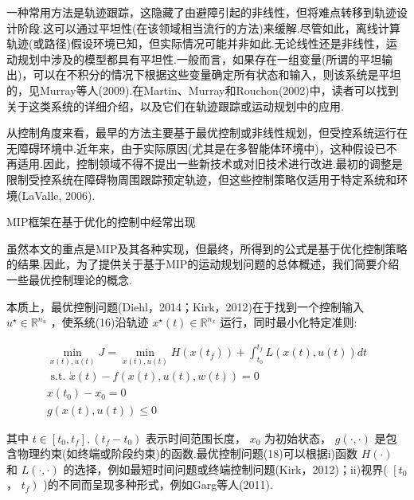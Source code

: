 \documentclass[10pt]{article}
\begin{document}
一种常用方法是轨迹跟踪，这隐藏了由避障引起的非线性，但将难点转移到轨迹设计阶段.这可以通过平坦性(在该领域相当流行的方法)来缓解.尽管如此，离线计算轨迹(或路径)假设环境已知，但实际情况可能并非如此.无论线性还是非线性，运动规划中涉及的模型都具有平坦性.一般而言，如果存在一组变量(所谓的平坦输出)，可以在不积分的情况下根据这些变量确定所有状态和输入，则该系统是平坦的，见Murray等人(2009).在Martin、Murray和Rouchon(2002)中，读者可以找到关于这类系统的详细介绍，以及它们在轨迹跟踪或运动规划中的应用.

从控制角度来看，最早的方法主要基于最优控制或非线性规划，但受控系统运行在无障碍环境中.近年来，由于实际原因(尤其是在多智能体环境中)，这种假设已不再适用.因此，控制领域不得不提出一些新技术或对旧技术进行改进.最初的调整是限制受控系统在障碍物周围跟踪预定轨迹，但这些控制策略仅适用于特定系统和环境(LaValle, 2006).

MIP框架在基于优化的控制中经常出现

虽然本文的重点是MIP及其各种实现，但最终，所得到的公式是基于优化控制策略的结果.因此，为了提供关于基于MIP的运动规划问题的总体概述，我们简要介绍一些最优控制理论的概念.

本质上，最优控制问题(Diehl，2014；Kirk，2012)在于找到一个控制输入 \({u}^{ \star  } \in  {\mathbb{R}}^{{n}_{u}}\) ，使系统(16)沿轨迹 \({x}^{ \star  }\left( t\right)  \in  {\mathbb{R}}^{{n}_{x}}\) 运行，同时最小化特定准则:

\begin{subequations}
\begin{gather}
\mathop{\min }\limits_{{x\left( t\right) ,u\left( t\right) }}J = \mathop{\min }\limits_{{x\left( t\right) ,u\left( t\right) }}H\left( {x\left( {t}_{f}\right) }\right)  + {\int }_{{t}_{0}}^{{t}_{f}}L\left( {x\left( t\right) ,u\left( t\right) }\right) {dt} \\
\text{ s.t. }\dot{x}\left( t\right)  - f\left( {x\left( t\right) ,u\left( t\right) ,w\left( t\right) }\right)  = 0 \\
x\left( {t}_{0}\right)  - {x}_{0} = 0 \\
g\left( {x\left( t\right) ,u\left( t\right) }\right)  \leq  0
\end{gather}
\end{subequations}

其中 \(t \in  \left\lbrack  {{t}_{0},{t}_{f}}\right\rbrack  ,\left( {{t}_{f} - {t}_{0}}\right)\) 表示时间范围长度， \({x}_{0}\) 为初始状态， \(g\left( {\cdot , \cdot  }\right)\) 是包含物理约束(如终端或阶段约束)的函数.最优控制问题(18)可以根据i)函数 \(H\left( \cdot \right)\) 和 \(L\left( {\cdot , \cdot  }\right)\) 的选择，例如最短时间问题或终端控制问题(Kirk，2012)；ii)视界( \(\left\lbrack  {t}_{0}\right.\) ， \(\left. {t}_{f}\right)\) )的不同而呈现多种形式，例如Garg等人(2011).
\end{document}
